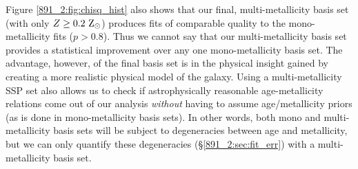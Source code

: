 Figure \ref{891_2:fig:chisq_hist} also shows that our final,
multi-metallicity basis set (with only $Z \geq 0.2~\mathrm{\mathrm{Z}_{\odot}} $)
produces fits of comparable quality to the mono-metallicity fits ($p >
0.8$). Thus we cannot say that our multi-metallicity basis set
provides a statistical improvement over any one mono-metallicity basis
set. The advantage, however, of the final basis set is in the physical
insight gained by creating a more realistic physical model of the
galaxy. Using a multi-metallicity SSP set also allows us to check if
astrophysically reasonable age-metallicity relations come out of our
analysis \emph{without} having to assume age/metallicity priors (as is
done in mono-metallicity basis sets). In other words, both mono and
multi-metallicity basis sets will be subject to degeneracies between
age and metallicity, but we can only quantify these degeneracies
(\S\ref{891_2:sec:fit_err}) with a multi-metallicity basis set.




